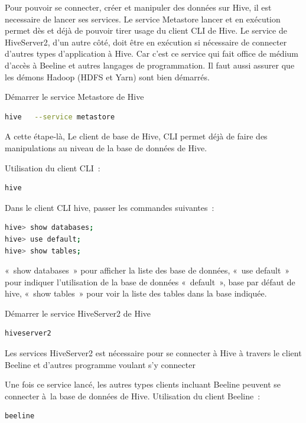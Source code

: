 \documentclass[12pt,english]{book}
\begin{document}
Pour pouvoir se connecter, créer et manipuler des données sur Hive, il est necessaire de lancer ses services. Le service Metastore lancer et en exécution permet dès et déjà de pouvoir tirer usage du client CLI de Hive.  Le service de HiveServer2, d'un autre côté, doit être en exécution si nécessaire de connecter d’autres types d’application à Hive.  Car c’est ce service qui fait office de médium d’accès à Beeline et autres langages de programmation. Il faut aussi assurer que les démons Hadoop (HDFS et Yarn) sont bien démarrés.

Démarrer le service Metastore de Hive

\begin{lstlisting}[language=bash, frame=single]
hive   --service metastore
\end{lstlisting}

A cette étape-là, Le client de base de Hive, CLI permet déjà de faire des manipulations au niveau de la base de données de Hive.

Utilisation du client CLI :
\begin{lstlisting}[language=bash, frame=single]
hive 
\end{lstlisting}

Dans le client CLI hive, passer les commandes suivantes :

\begin{lstlisting}[language=bash, frame=single]
hive> show databases;
hive> use default;
hive> show tables;
\end{lstlisting}

« show databases » pour afficher la liste des base de données, « use default » pour indiquer l’utilisation de la base de données « default », base par défaut  de hive, « show tables » pour voir la liste des tables dans la base indiquée.

Démarrer le service HiveServer2 de Hive

\begin{lstlisting}[language=bash, frame=single]
hiveserver2
\end{lstlisting}

Les services HiveServer2 est nécessaire pour se connecter à Hive à travers le client Beeline et d’autres programme voulant s’y connecter

Une fois ce service lancé, les autres types clients incluant Beeline peuvent se connecter à la base de données de Hive.
Utilisation du client Beeline :

\begin{lstlisting}[language=bash, frame=single]
beeline
\end{lstlisting}
\end{document}
